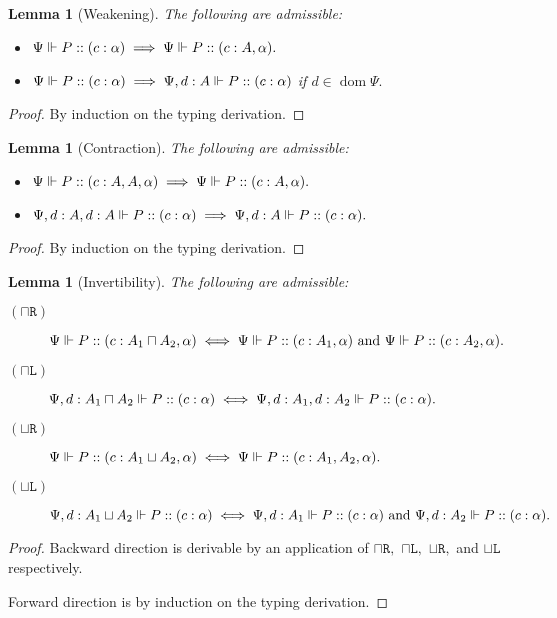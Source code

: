 \documentclass[11pt]{article}
\theoremstyle{plain}
\newtheorem{lemma}[theorem]{Lemma}
\theoremstyle{definition}
\theoremstyle{remark}
\DeclarePairedDelimiter\parens{(}{)}             %
\DeclareMathOperator\dom{dom}
\newcommand\intersect{\mathbin{\sqcap}}
\newcommand\union{\mathbin{\sqcup}}
\newcommand\irb[1]{\texttt{#1}}
\newcommand\Right{\irb{R}}
\newcommand\Left{\irb{L}}
\newcommand{\ctx}{\Psi}
\newcommand\typeBi[4]{#1 \Vdash #2 :: \parens{#3 : #4}}
\newcommand{\typeList}{\alpha}
\begin{document}
\begin{lemma}[Weakening]
  The following are admissible:
  \begin{itemize}
    \item $\typeBi \ctx P c \typeList \implies \typeBi \ctx P c {A, \typeList}.$
    \item $\typeBi \ctx P c \typeList \implies \typeBi {\ctx, d : A} P c \typeList$ if $d \in \dom \ctx.$
  \end{itemize}
\end{lemma}
\begin{proof}
  By induction on the typing derivation.
\end{proof}

\begin{lemma}[Contraction]
  The following are admissible:
  \begin{itemize}
    \item $\typeBi \ctx P c {A, A, \typeList} \implies \typeBi \ctx P c {A, \typeList}.$
    \item $\typeBi {\ctx, d : A, d : A} P c \typeList \implies \typeBi {\ctx, d : A} P c \typeList.$
  \end{itemize}
\end{lemma}
\begin{proof}
  By induction on the typing derivation.
\end{proof}

\begin{lemma}[Invertibility]
  The following are admissible:
  \begin{description}
    \item[$(\intersect\Right)$] $\typeBi \ctx P c {A_1 \intersect A_2, \typeList} \iff \typeBi \ctx P c {A_1, \typeList} \text{ and } \typeBi \ctx P c {A_2, \typeList}.$
    \item[$(\intersect\Left)$] $\typeBi {\ctx, d : A_1 \intersect A_2} P c \typeList \iff
    \typeBi {\ctx, d : A_1, d : A_2} P c \typeList.$
    \item[$(\union\Right)$] $\typeBi \ctx P c {A_1 \union A_2, \typeList} \iff \typeBi \ctx P c {A_1, A_2, \typeList}.$
    \item[$(\union\Left)$] $\typeBi {\ctx, d : A_1 \union A_2} P c \typeList \iff
    \typeBi {\ctx, d : A_1} P c \typeList
    \text{ and } \typeBi {\ctx, d : A_2} P c \typeList.$
  \end{description}
\end{lemma}
\begin{proof}
  Backward direction is derivable by an application of $\intersect\Right,$ $\intersect\Left,$ $\union\Right,$ and $\union\Left$ respectively.

  Forward direction is by induction on the typing derivation.
\end{proof}
\end{document}
